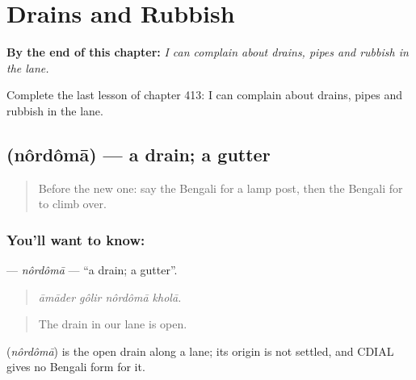 
\chapter{Drains and Rubbish}
\label{ch:bn-drains-and-rubbish}

\begin{chapteropening}
\textbf{By the end of this chapter:} \emph{I can complain about drains, pipes and rubbish in the lane.}

Complete the last lesson of chapter 413: I can complain about drains, pipes and rubbish in the lane.
\end{chapteropening}

\section[\texorpdfstring{\bn{নর্দমা} (nôrdômā)}{নর্দমা (nôrdômā)}]{ (nôrdômā) — a drain; a gutter}

\label{lesson:BN-C413-nordoma}



\begin{quote}
Before the new one: say the Bengali for a lamp post, then the Bengali for to climb over.
\end{quote}

\subsection*{You'll want to know: }
\textbf{} — \emph{nôrdômā} — \textquotedblleft{}a drain; a gutter\textquotedblright{}.

\begin{quote}
   
\end{quote}

\begin{quote}
\emph{āmāder gôlir nôrdômā kholā.}
\end{quote}

\begin{quote}
The drain in our lane is open.
\end{quote}

\begin{cousinweb}
\textbf{} (\emph{nôrdômā}) is the open drain along a lane; its origin is not settled, and CDIAL gives no Bengali form for it.
\end{cousinweb}

